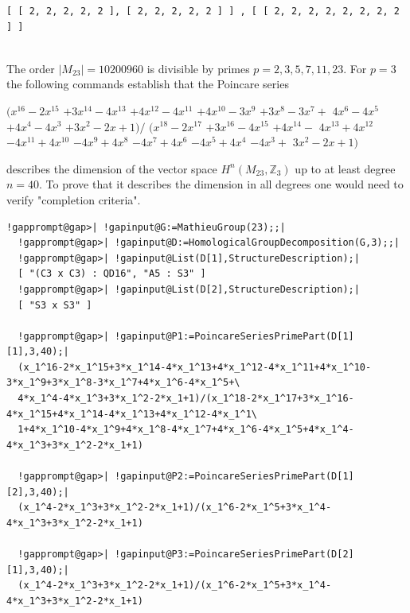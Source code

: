 \documentclass[a4paper,11pt]{report}
\begin{document}
{{\begin{Verbatim}[commandchars=!@|,fontsize=\small,frame=single,label=Example]
  [ [ 2, 2, 2, 2, 2 ], [ 2, 2, 2, 2, 2 ] ] , [ [ 2, 2, 2, 2, 2, 2, 2, 2 ] ]
  
\end{Verbatim}
 

The order $|M_{23}|=10200960$ is divisible by primes $p=2, 3, 5, 7, 11, 23$. For $p=3$ the following commands establish that the Poincare series 

$(x^{16} - 2x^{15}$ $ + 3x^{14} - 4x^{13}$ $ + 4x^{12} - 4x^{11}$ $ + 4x^{10} - 3x^9$ $ + 3x^8 - 3x^7 +$ $ 4x^6 - 4x^5 $ $+ 4x^4 -4x^3$ $ + 3x^2 -2x + 1) /$ $ (x^{18} - 2x^{17}$ $ + 3x^{16} - 4x^{15}$ $ + 4x^{14} - $ $4x^{13} + 4x^{12}$ $ - 4x^{11} + 4x^{10}$ $ - 4x^9 + 4x^8$ $ - 4x^7 + 4x^6 $ $ - 4x^5 + 4x^4$ $ - 4x^3 +$ $ 3x^2 - 2x + 1)$ 

describes the dimension of the vector space $H^n(M_{23},\mathbb Z_3)$ up to at least degree $n=40$. To prove that it describes the dimension in all degrees one would need to
verify "completion criteria". 
\begin{Verbatim}[commandchars=!@|,fontsize=\small,frame=single,label=Example]
  !gapprompt@gap>| !gapinput@G:=MathieuGroup(23);;|
  !gapprompt@gap>| !gapinput@D:=HomologicalGroupDecomposition(G,3);;|
  !gapprompt@gap>| !gapinput@List(D[1],StructureDescription);|
  [ "(C3 x C3) : QD16", "A5 : S3" ]
  !gapprompt@gap>| !gapinput@List(D[2],StructureDescription);|
  [ "S3 x S3" ]
  
  !gapprompt@gap>| !gapinput@P1:=PoincareSeriesPrimePart(D[1][1],3,40);|
  (x_1^16-2*x_1^15+3*x_1^14-4*x_1^13+4*x_1^12-4*x_1^11+4*x_1^10-3*x_1^9+3*x_1^8-3*x_1^7+4*x_1^6-4*x_1^5+\
  4*x_1^4-4*x_1^3+3*x_1^2-2*x_1+1)/(x_1^18-2*x_1^17+3*x_1^16-4*x_1^15+4*x_1^14-4*x_1^13+4*x_1^12-4*x_1^1\
  1+4*x_1^10-4*x_1^9+4*x_1^8-4*x_1^7+4*x_1^6-4*x_1^5+4*x_1^4-4*x_1^3+3*x_1^2-2*x_1+1)
  
  !gapprompt@gap>| !gapinput@P2:=PoincareSeriesPrimePart(D[1][2],3,40);|
  (x_1^4-2*x_1^3+3*x_1^2-2*x_1+1)/(x_1^6-2*x_1^5+3*x_1^4-4*x_1^3+3*x_1^2-2*x_1+1)
  
  !gapprompt@gap>| !gapinput@P3:=PoincareSeriesPrimePart(D[2][1],3,40);|
  (x_1^4-2*x_1^3+3*x_1^2-2*x_1+1)/(x_1^6-2*x_1^5+3*x_1^4-4*x_1^3+3*x_1^2-2*x_1+1)
  
\end{Verbatim}
 }

 
}
\end{document}
